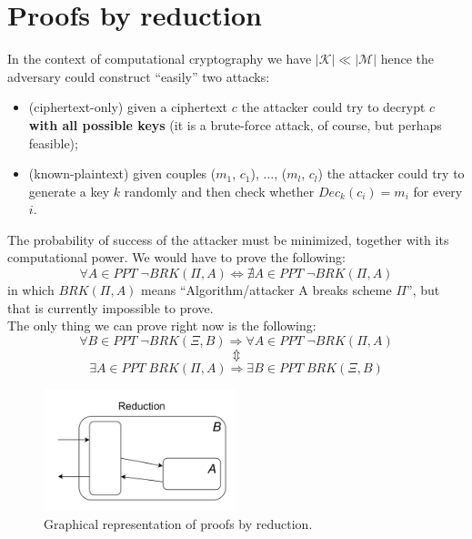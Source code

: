\documentclass[../main]{subfiles}
\begin{document}
\section{Proofs by reduction}

In the context of computational cryptography we have $|\mathcal{K}| \ll{} |\mathcal{M}|$ hence the adversary could construct ``easily'' two attacks:
\begin{itemize}
    \item (ciphertext-only) given a ciphertext $c$ the attacker could try to decrypt $c$ \textbf{with all possible keys} (it is a brute-force attack, of course, but perhaps feasible);
    \item (known-plaintext) given couples ($m_1$, $c_1$), ..., ($m_l$, $c_l$) the attacker could try to generate a key $k$ randomly and then check whether $Dec_k(c_i) = m_i$ for every $i$.
\end{itemize}
The probability of success of the attacker must be minimized, together with its computational power.
We would have to prove the following:
$$\forall{} A \in{} PPT \; \neg BRK(\Pi, A) \Leftrightarrow{} \nexists{} A \in{} PPT \; \neg BRK(\Pi, A)$$
in which $BRK(\Pi, A)$ means ``Algorithm/attacker A breaks scheme $\Pi$'', but that is currently impossible to prove.\\
The only thing we can prove right now is the following:
$$\forall{} B \in{} PPT \; \neg BRK(\Xi, B) \Rightarrow{} \forall{} A \in{} PPT \; \neg BRK(\Pi, A)$$
$$\Updownarrow$$
$$\exists{} A \in{} PPT \; BRK(\Pi, A) \Rightarrow{} \exists{} B \in{} PPT \; BRK(\Xi, B)$$
\begin{figure}[h]
    \centering
    \includegraphics[width=0.5\textwidth]{images/reduction}
    \caption{Graphical representation of proofs by reduction.}
\end{figure}
\end{document}
